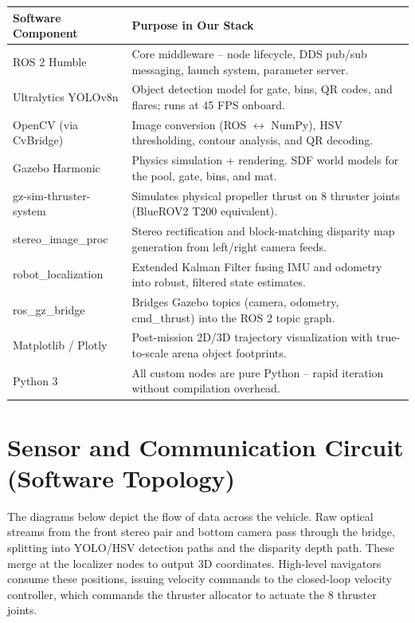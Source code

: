 \documentclass[10.5pt,a4paper]{article}
\begin{document}
\begin{table}[H]\centering\small
\begin{tabularx}{\textwidth}{L{4cm} X}
\toprule
{}\textbf{Software Component} & \textbf{Purpose in Our Stack} \\
\midrule
ROS 2 Humble & Core middleware -- node lifecycle, DDS pub/sub messaging, launch system, parameter server. \\
Ultralytics YOLOv8n & Object detection model for gate, bins, QR codes, and flares; runs at 45 FPS onboard. \\
OpenCV (via CvBridge) & Image conversion (ROS $\leftrightarrow$ NumPy), HSV thresholding, contour analysis, and QR decoding. \\
Gazebo Harmonic & Physics simulation + rendering. SDF world models for the pool, gate, bins, and mat. \\
gz-sim-thruster-system & Simulates physical propeller thrust on 8 thruster joints (BlueROV2 T200 equivalent). \\
stereo\_image\_proc & Stereo rectification and block-matching disparity map generation from left/right camera feeds. \\
robot\_localization & Extended Kalman Filter fusing IMU and odometry into robust, filtered state estimates. \\
ros\_gz\_bridge & Bridges Gazebo topics (camera, odometry, cmd\_thrust) into the ROS 2 topic graph. \\
Matplotlib / Plotly & Post-mission 2D/3D trajectory visualization with true-to-scale arena object footprints. \\
Python 3 & All custom nodes are pure Python -- rapid iteration without compilation overhead. \\
\bottomrule
\end{tabularx}
\end{table}

\section{Sensor and Communication Circuit (Software Topology)}

The diagrams below depict the flow of data across the vehicle. Raw optical streams from the
front stereo pair and bottom camera pass through the bridge, splitting into YOLO/HSV
detection paths and the disparity depth path. These merge at the localizer nodes to output 3D
coordinates. High-level navigators consume these positions, issuing velocity commands to the
closed-loop velocity controller, which commands the thruster allocator to actuate the 8
thruster joints.
\end{document}
